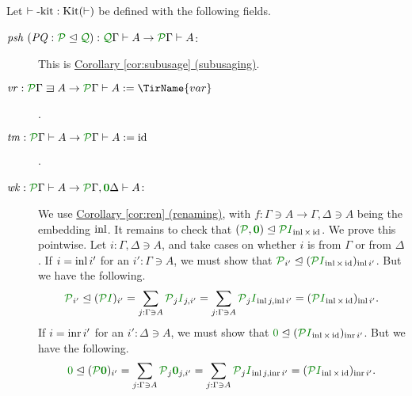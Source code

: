 \documentclass[submission,copyright,creativecommons]{eptcs}
\begin{document}
\begin{definition}\label{tm-kit}
  Let $\vdash\textrm{-kit} : \operatorname{Kit}(\vdash)$ be defined with the following
  fields.
  \begin{description}
    \item[$\mathit{psh}~(\mathit{PQ} : \resctx P \subres \resctx Q)
      : \ctx{\Gamma}{Q} \vdash A \to \ctx{\Gamma}{P} \vdash A$:]
      This is \hyperref[cor:subusage]{Corollary \ref*{cor:subusage} (subusaging)}.
      

    \item[$\mathit{vr} : \ctx{\Gamma}{P} \lvar A \to \ctx{\Gamma}{P} \vdash A
      := \TirName{var}$].
    \item[$\mathit{tm} : \ctx{\Gamma}{P} \vdash A \to \ctx{\Gamma}{P} \vdash A
      := \mathrm{id}$].
    \item[$\mathit{wk} : \ctx{\Gamma}{P} \vdash A \to \ctx{\Gamma}{P},
      \ctx{\Delta}{\vct 0} \vdash A$:] We use \hyperref[cor:ren]{Corollary \ref*{cor:ren} (renaming)}, with
      $f : \Gamma \ni A \to \Gamma, \Delta \ni A$ being the embedding
      $\operatorname{inl}$.  It remains to check that
      $(\resctx P, \rescomment{\vct 0}) \subres \resctx P\rescomment
      I_{\inl\times\id}$.  We prove this pointwise.  Let
      $i : \Gamma, \Delta \ni A$, and take cases on whether $i$ is
      from $\Gamma$ or from $\Delta$.  If $i = \operatorname{inl} i'$ for an
      $i' : \Gamma \ni A$, we must show that
      $\resctx P_{i'} \subres (\resctx P\rescomment
      I_{\inl\times\id})_{\inl i'}$.  But we have the following.
      \[
      \resctx P_{i'} \subres (\resctx P\rescomment I)_{i'}
      = \sum_{j : \Gamma \ni A} \resctx P_j\rescomment I_{j,i'}
      = \sum_{j : \Gamma \ni A} \resctx P_j\rescomment I_{\inl j,\inl i'}
      = (\resctx P\rescomment I_{\inl\times\id})_{\inl i'}.
      \]
      If $i = \operatorname{inr} i'$ for an $i' : \Delta \ni A$, we must show that
      $\rescomment 0 \subres
      (\resctx P\rescomment I_{\inl\times\id})_{\inr i'}$.
      But we have the following.
      \[
      \rescomment 0 \subres (\resctx P\rescomment{\vct 0})_{i'}
      = \sum_{j : \Gamma \ni A} \resctx P_j\rescomment{\vct 0}_{j,i'}
      = \sum_{j : \Gamma \ni A} \resctx P_j\rescomment I_{\inl j,\inr i'}
      = (\resctx P\rescomment I_{\inl\times\id})_{\inr i'}.
      \]
  \end{description}
\end{definition}
\end{document}
